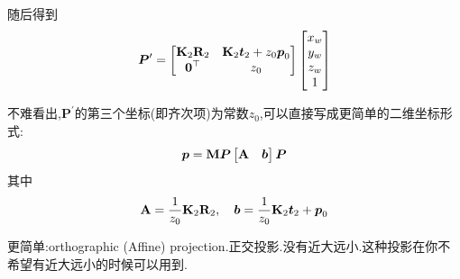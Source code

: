 随后得到
\begin{equation}
	\boldsymbol P^\prime = 
	\begin{bmatrix}
		\bold{K}_2 \bold{R}_2 & \bold{K}_2 \boldsymbol t_2 + z_0 \boldsymbol p_0
		\\
		\boldsymbol 0^\top & z_0
	\end{bmatrix}
	\begin{bmatrix}
		x_w
		\\
		y_w 
		\\
		z_w
		\\
		1
	\end{bmatrix}
\end{equation}

不难看出,$\bm P^\prime$的第三个坐标(即齐次项)为常数$z_0$,可以直接写成更简单的二维坐标形式:
\begin{equation}
	\boldsymbol p = \bold{M} \boldsymbol P
	\begin{bmatrix}
		\bold{A} & \boldsymbol b
	\end{bmatrix} \boldsymbol P
\end{equation}
其中
\begin{equation}
	\bold{A} = \frac{1}{z_0} \bold{K}_2 \bold{R}_2, \quad \boldsymbol b = \frac{1}{z_0} \bold{K}_2 \boldsymbol t_2 + \boldsymbol p_0
\end{equation}


更简单:orthographic (Affine) projection.正交投影.没有近大远小.这种投影在你不希望有近大远小的时候可以用到.